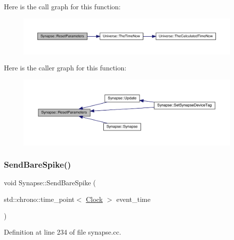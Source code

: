 Here is the call graph for this function\+:\nopagebreak
\begin{figure}[H]
\begin{center}
\leavevmode
\includegraphics[width=350pt]{class_synapse_a5b2bbc3553e92492a5c38d1d797fcd92_cgraph}
\end{center}
\end{figure}
Here is the caller graph for this function\+:
\nopagebreak
\begin{figure}[H]
\begin{center}
\leavevmode
\includegraphics[width=350pt]{class_synapse_a5b2bbc3553e92492a5c38d1d797fcd92_icgraph}
\end{center}
\end{figure}
\mbox{\label{class_synapse_a0e28e56ecea170443fdd9722622da6b9}} 
\subsubsection{\texorpdfstring{Send\+Bare\+Spike()}{SendBareSpike()}}
{\footnotesize\ttfamily void Synapse\+::\+Send\+Bare\+Spike (\begin{DoxyParamCaption}\item[{std\+::chrono\+::time\+\_\+point$<$ \hyperlink{universe_8h_a0ef8d951d1ca5ab3cfaf7ab4c7a6fd80}{Clock} $>$}]{event\+\_\+time }\end{DoxyParamCaption})}



Definition at line 234 of file synapse.\+cc.

